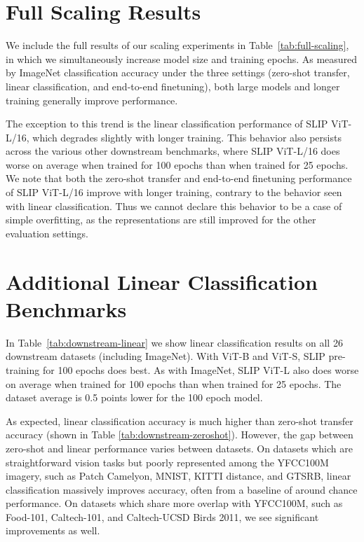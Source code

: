 \documentclass[10pt,twocolumn,letterpaper]{article}
\begin{document}
\section{Full Scaling Results}



We include the full results of our scaling experiments in Table~\ref{tab:full-scaling}, in which we simultaneously increase model size and training epochs.
As measured by ImageNet classification accuracy under the three settings (zero-shot transfer, linear classification, and end-to-end finetuning), both large models and longer training generally improve performance.


The exception to this trend is the linear classification performance of SLIP ViT-L/16, which degrades slightly with longer training.
This behavior also persists across the various other downstream benchmarks, where SLIP ViT-L/16 does worse on average when trained for 100 epochs than when trained for 25 epochs.
We note that both the zero-shot transfer and end-to-end finetuning performance of SLIP ViT-L/16 improve with longer training, contrary to the behavior seen with linear classification.
Thus we cannot declare this behavior to be a case of simple overfitting, as the representations are still improved for the other evaluation settings.

\section{Additional Linear Classification Benchmarks}
In Table~\ref{tab:downstream-linear} we show linear classification results on all 26 downstream datasets (including ImageNet).
With ViT-B and ViT-S, SLIP pre-training for 100 epochs does best.
As with ImageNet, SLIP ViT-L also does worse on average when trained for 100 epochs than when trained for 25 epochs.
The dataset average is 0.5 points lower for the 100 epoch model.

As expected, linear classification accuracy is much higher than zero-shot transfer accuracy (shown in Table \ref{tab:downstream-zeroshot}).
However, the gap between zero-shot and linear performance varies between datasets.
On datasets which are straightforward vision tasks but poorly represented among the YFCC100M imagery, such as Patch Camelyon, MNIST, KITTI distance, and GTSRB, linear classification massively improves accuracy, often from a baseline of around chance performance.
On datasets which share more overlap with YFCC100M, such as Food-101, Caltech-101, and Caltech-UCSD Birds 2011, we see significant improvements as well.
\end{document}
